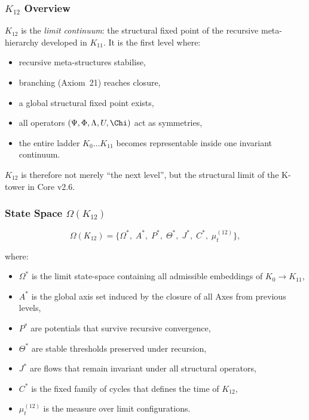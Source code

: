 

\subsubsection{$K_{12}$ Overview}
\label{sec:k12-overview}

$K_{12}$ is the \emph{limit continuum}: the structural fixed point of the
recursive meta-hierarchy developed in $K_{11}$.  
It is the first level where:

\begin{itemize}
    \item recursive meta-structures stabilise,
    \item branching (Axiom~21) reaches closure,
    \item a global structural fixed point exists,
    \item all operators $(\Psi,\Phi,\Lambda,U,\Chi)$ act as symmetries,
    \item the entire ladder $K_0\dots K_{11}$ becomes representable inside one
          invariant continuum.
\end{itemize}

$K_{12}$ is therefore not merely “the next level”, but the structural limit of
the K-tower in Core v2.6.

\subsubsection{State Space $\Omega(K_{12})$}

\[
\Omega(K_{12}) =
\{
\Omega^*,\;
A^*,\;
P^*,\;
\Theta^*,\;
J^*,\;
C^*,\;
\mu^{(12)}_t
\},
\]

where:
\begin{itemize}
    \item $\Omega^*$ is the limit state-space containing all admissible embeddings
          of $K_0\!\to\!K_{11}$,
    \item $A^*$ is the global axis set induced by the closure of all Axes
          from previous levels,
    \item $P^*$ are potentials that survive recursive convergence,
    \item $\Theta^*$ are stable thresholds preserved under recursion,
    \item $J^*$ are flows that remain invariant under all structural operators,
    \item $C^*$ is the fixed family of cycles that defines the time of $K_{12}$,
    \item $\mu^{(12)}_t$ is the measure over limit configurations.
\end{itemize}


